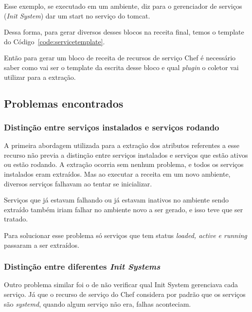 Esse exemplo, se executado em um ambiente, diz para o
gerenciador de serviços (\textit{Init System}) dar um start no serviço do tomcat.

Dessa forma, para gerar diversos desses blocos na receita final, temos o template
do Código~\ref{code:servicetemplate}.

\noindent\begin{minipage}{\textwidth}
  \lstset{style=shell}
  
\end{minipage}\hfill

Então para gerar um bloco de receita de recursos de serviço Chef é necessário
saber como vai ser o template da escrita desse bloco e qual \textit{plugin} o
coletor vai utilizar para a extração.

\subsection{Problemas encontrados}

\subsubsection{Distinção entre serviços instalados e serviços rodando}
A primeira abordagem utilizada para a extração dos atributos referentes a esse
recurso não previa a distinção entre serviços instalados e serviços que estão
ativos ou estão rodando. A extração ocorria sem nenhum problema, e todos os serviços
instalados eram extraídos. Mas ao executar a receita em um novo ambiente, diversos
serviços falhavam ao tentar se inicializar.

Serviços que já estavam falhando ou já estavam inativos no ambiente sendo extraído
também iriam falhar no ambiente novo a ser gerado, e isso teve que ser tratado.


Para solucionar esse problema só serviços que tem status \textit{loaded, active e running}
passaram a ser extraídos.\

\subsubsection{Distinção entre diferentes \textit{Init Systems}}
Outro problema similar foi o de não verificar qual Init System gerenciava cada
serviço. Já que o recurso de serviço do Chef considera por padrão que os serviços
são \textit{systemd}, quando algum serviço não era, falhas aconteciam.

